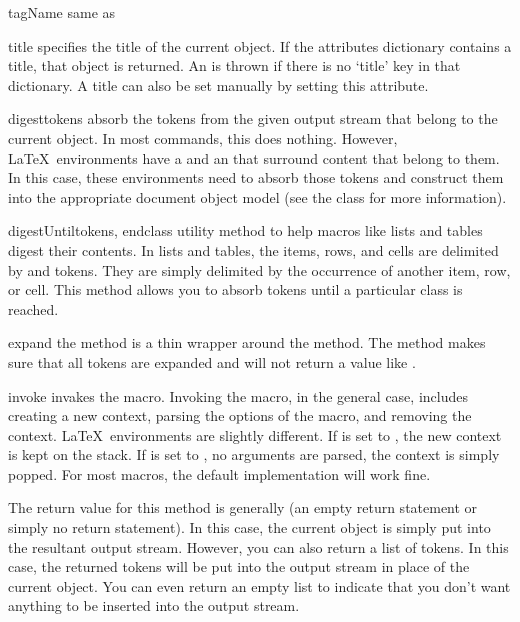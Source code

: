 \begin{memberdesc}[Macro]{tagName}
same as 
\end{memberdesc}

\begin{memberdesc}[Macro]{title}
specifies the title of the current object.  If the attributes dictionary
contains a title, that object is returned.  An 
is thrown if there is no `title' key in that dictionary.  A title can also be 
set manually by setting this attribute.
\end{memberdesc}



\begin{methoddesc}[Macro]{digest}{tokens}
absorb the tokens from the given output stream that belong to the current
object.  In most commands, this does nothing.  However, \LaTeX\ environments
have a  and an  that surround content that belong 
to them.  In this case, these environments need to absorb those tokens 
and construct them into the appropriate document object model (see the
 class for more information).
\end{methoddesc}

\begin{methoddesc}[Macro]{digestUntil}{tokens, endclass}
utility method to help macros like lists and tables digest their contents.
In lists and tables, the items, rows, and cells are delimited by 
 and  tokens.  They are simply delimited by the
occurrence of another item, row, or cell.  This method allows you to
absorb tokens until a particular class is reached.
\end{methoddesc}

\begin{methoddesc}[Macro]{expand}{}
the  method is a thin wrapper around the 
method.  The  method makes sure that all tokens are
expanded and will not return a  value like .
\end{methoddesc}

\begin{methoddesc}[Macro]{invoke}{}
invakes the macro.  Invoking the macro, in the general case, includes 
creating a new context, parsing the options of the macro, and removing 
the context.  \LaTeX\ environments are slightly different.  If 
 is set to , the new context
is kept on the stack.  If  is set to ,
no arguments are parsed, the context is simply popped.  For most macros, the
default implementation will work fine.

The return value for this method is generally  (an empty return
statement or simply no return statement).  In this case, the current object
is simply put into the resultant output stream.  However, you can also
return a list of tokens.  In this case, the returned tokens will be put 
into the output stream in place of the current object.  You can even 
return an empty list to indicate that you don't want anything to be 
inserted into the output stream.
\end{methoddesc}

